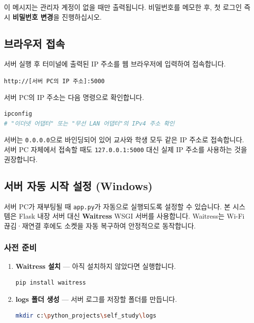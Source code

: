 \documentclass[a4paper,12pt]{article}
\begin{document}
\begin{warnbox}
  이 메시지는 관리자 계정이 없을 때만 출력됩니다.
  비밀번호를 메모한 후, 첫 로그인 즉시 \textbf{비밀번호 변경}을 진행하십시오.
\end{warnbox}

\subsection{브라우저 접속}

서버 실행 후 터미널에 출력된 IP 주소를 웹 브라우저에 입력하여 접속합니다.

\begin{center}
\large\texttt{\textcolor{primary}{http://[서버 PC의 IP 주소]:5000}}
\end{center}

서버 PC의 IP 주소는 다음 명령으로 확인합니다.

\begin{lstlisting}[language=bash, caption=서버 PC IP 주소 확인]
ipconfig
# "이더넷 어댑터" 또는 "무선 LAN 어댑터"의 IPv4 주소 확인
\end{lstlisting}

\begin{tipbox}
  서버는 \texttt{0.0.0.0}으로 바인딩되어 있어 교사와 학생 모두
  같은 IP 주소로 접속합니다. 서버 PC 자체에서 접속할 때도
  \texttt{127.0.0.1:5000} 대신 실제 IP 주소를 사용하는 것을 권장합니다.
\end{tipbox}

\subsection{서버 자동 시작 설정 (Windows)}

서버 PC가 재부팅될 때 \texttt{app.py}가 자동으로 실행되도록 설정할 수 있습니다.
본 시스템은 Flask 내장 서버 대신 \textbf{Waitress} WSGI 서버를 사용합니다.
Waitress는 Wi-Fi 끊김·재연결 후에도 소켓을 자동 복구하여 안정적으로 동작합니다.

\subsubsection{사전 준비}

\begin{enumerate}[leftmargin=1.5em]
    \item \textbf{Waitress 설치} --- 아직 설치하지 않았다면 실행합니다.
\begin{lstlisting}[language=bash]
pip install waitress
\end{lstlisting}

    \item \textbf{logs 폴더 생성} --- 서버 로그를 저장할 폴더를 만듭니다.
\begin{lstlisting}[language=bash]
mkdir c:\python_projects\self_study\logs
\end{lstlisting}
\end{enumerate}
\end{document}
